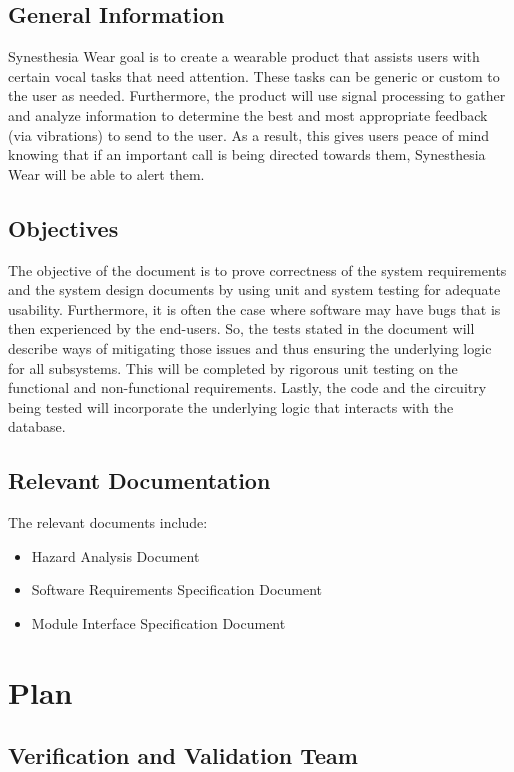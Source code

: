 \documentclass[12pt, titlepage]{article}
\begin{document}
\subsection{General Information}

Synesthesia Wear goal is to create a wearable product that assists users with certain vocal tasks that need attention. These tasks can be generic or custom to the user as needed. Furthermore, the product will use signal processing to gather and analyze information to determine the best and most appropriate feedback (via vibrations) to send to the user. As a result, this gives users peace of mind knowing that if an important call is being directed towards them, Synesthesia Wear will be able to alert them.

\subsection{Objectives}

The objective of the document is to prove correctness of the system requirements and the system design documents by using unit and system testing for adequate usability. Furthermore, it is often the case where software may have bugs that is then experienced by the end-users. So, the tests stated in the document will describe ways of mitigating those issues and thus ensuring the underlying logic for all subsystems. This will be completed by rigorous unit testing on the functional and non-functional requirements. Lastly, the code and the circuitry being tested will incorporate the underlying logic that interacts with the database.
\subsection{Relevant Documentation}

The relevant documents include:
\begin{itemize}
\item Hazard Analysis Document
\item Software Requirements Specification Document
\item Module Interface Specification Document

\end{itemize}

\section{Plan}


\subsection{Verification and Validation Team}
\end{document}
